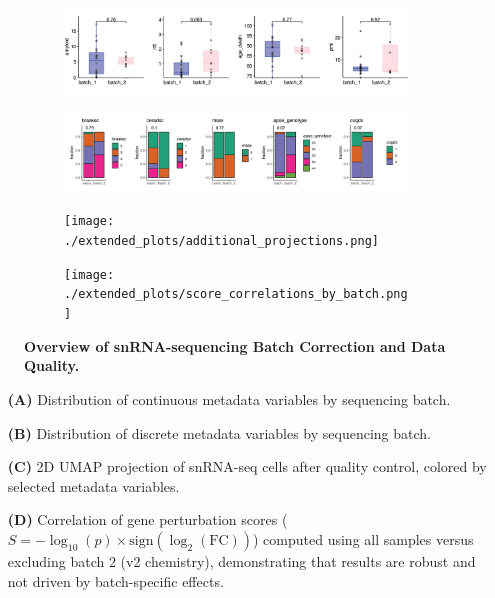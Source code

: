 \begin{figure}[H]
    \begin{subfigure}[t]{\textwidth}
        \caption{}
        \includegraphics[width=\textwidth]{./extended_plots/seq_batch_cont.png}        
    \end{subfigure}
    \begin{subfigure}[t]{\textwidth}
        \caption{}
        \includegraphics[width=\textwidth]{./extended_plots/seq_batch_cat.png}        
    \end{subfigure}  
    \begin{subfigure}[t]{\textwidth}
        \caption{}
        \texttt{[image: ./extended\_plots/additional\_projections.png]}        
    \end{subfigure}   
    \begin{subfigure}[t]{\textwidth}
        \caption{}
        \texttt{[image: ./extended\_plots/score\_correlations\_by\_batch.png]}        
    \end{subfigure}   
    \caption{
        \textbf{Overview of snRNA-sequencing Batch Correction and Data Quality.}\\
    }
    \label{fig:snRNA_batch_quality}
\end{figure}
\begin{itemize}
    \item[\textbf{(A)}] Distribution of continuous metadata variables by sequencing batch.
    \item[\textbf{(B)}] Distribution of discrete metadata variables by sequencing batch.
    \item[\textbf{(C)}] 2D UMAP projection of snRNA-seq cells after quality control, colored by selected metadata variables.
    \item[\textbf{(D)}] Correlation of gene perturbation scores ($S = -\log_{10}(p)\times\text{sign}(\log_2(\text{FC}))$) computed using all samples versus excluding batch 2 (v2 chemistry), demonstrating that results are robust and not driven by batch-specific effects.
\end{itemize}